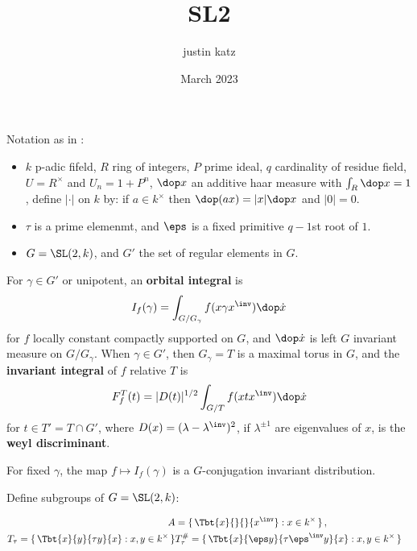 \documentclass{article}
\title{SL2}
\author{justin katz}
\date{March 2023}
\begin{document}
Notation as in \cite{sallyFourierTransformOrbital1983}:
\begin{itemize}
    \item $k$ p-adic fifeld, $R$ ring of integers, $P$ prime ideal, $q$ cardinality of residue field, $U = R^\times$ and $U_n = 1 + P^n$, $\dop x$ an additive haar measure with $\int_R \dop x =1$, define $|\cdot|$ on $k$ by: if $a\in k^\times$ then $\dop(ax) = |x| \dop x$ and $|0|=0$. 
    \item $\tau$ is a prime elemenmt, and $\eps$ is a fixed primitive $q-1$st root of $1$. 
    \item $G = \SL(2,k)$, and $G'$ the set of regular elements in $G$. 
\end{itemize}

For $\gamma \in G'$ or unipotent, an \textbf{orbital integral} is
\begin{align*}
    I_f(\gamma) = \int_{G/G_\gamma}f(x \gamma x^\inv)\dop \dot{x} 
\end{align*}
for $f$ locally constant compactly supported on $G$, and $\dop \dot{x}$ is left $G$ invariant measure on $G/G_\gamma$. When $\gamma \in G'$, then $G_\gamma =T$ is a maximal torus in $G$, and the \textbf{invariant integral} of $f$ relative $T$ is 
\begin{align*}
    F_f^T(t) = |D(t)|^{1/2} \int_{G/T} f(xtx^\inv)\dop \dot{x}
\end{align*}
for $t\in T' = T\cap G'$, where $D(x) = (\lambda-\lambda^\inv)^2$, if $\lambda^{\pm 1}$ are eigenvalues of $x$, is the \textbf{weyl discriminant}. 

For fixed $\gamma$, the map $f\mapsto I_f(\gamma)$ is a $G$-conjugation invariant distribution. 

Define subgroups of $G=\SL(2,k)$:

\begin{align*}
    A &= \set{\Tbt{x}{}{}{x^\inv}: x \in k^\times}, & \\
    T_\tau = \set{\Tbt{x}{y}{\tau y}{x}: x,y \in k^\times} & T_\tau^\# = \set{\Tbt{x}{\eps y}{\tau\eps^\inv y}{x}: x,y \in k^\times} 
\end{align*}




\end{document}
